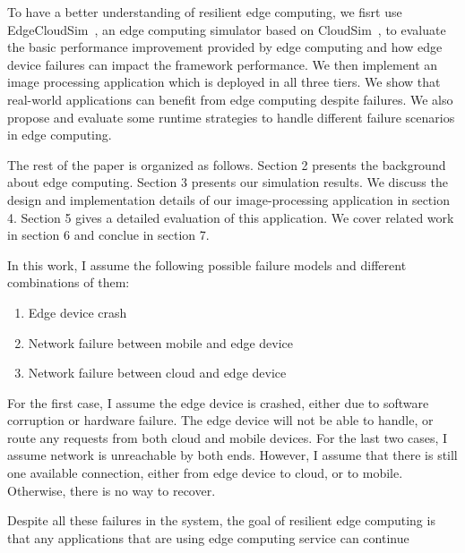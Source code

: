 To have a better understanding of resilient edge computing, we fisrt use EdgeCloudSim~\cite{edgecloudsim},
an edge computing simulator based on CloudSim~\cite{cloudsim},
to evaluate the basic performance improvement provided by edge computing and how edge device failures can impact
the framework performance. We then implement an image processing application which is
deployed in all three tiers. We show that real-world applications can benefit from edge computing
despite failures. We also propose and evaluate some runtime strategies to handle different
failure scenarios in edge computing.

The rest of the paper is organized as follows. Section 2 presents the background about
edge computing. Section 3 presents our simulation results. We discuss the design
and implementation details of our image-processing application in section 4. Section 5 gives a detailed
evaluation of this application. We cover related work in section 6 and conclue in section 7.

In this work, I assume the following possible failure models and different combinations
of them:
\begin{enumerate}
\item Edge device crash
\item Network failure between mobile and edge device
\item Network failure between cloud and edge device
\end{enumerate}

For the first case, I assume the edge device is crashed, either due to software
corruption or hardware failure. The edge device will not be able to handle, or
route any requests from both cloud and mobile devices. For the last two cases,
I assume network is unreachable by both ends. However, I assume that there is
still one available connection, either from edge device to cloud, or to mobile.
Otherwise, there is no way to recover.

Despite all these failures in the system, the goal of resilient edge computing
is that any applications that are using edge computing service can continue
\fi
